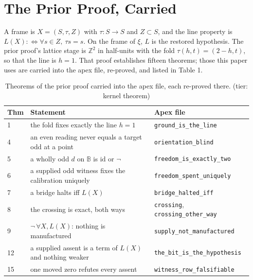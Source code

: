 \documentclass[10pt,twocolumn]{article}
\begin{document}
\hypertarget{the-prior-proof-carried}{%
\section{The Prior Proof, Carried}\label{the-prior-proof-carried}}

A frame is \(X = (S, \tau, Z)\) with \(\tau : S \to S\) and
\(Z \subset S\), and the line property is
\(L(X) :\Leftrightarrow \forall s \in Z,\ \tau s = s\). On the frame of
\(\xi\), \(L\) is the restored hypothesis. The prior proof's lattice
stage is \(\mathbb{Z}^2\) in half-units with the fold
\(\tau(h, t) = (2 - h, t)\), so that the line is \(h = 1\). That proof
establishes fifteen theorems; those this paper uses are carried into the
apex file, re-proved, and listed in Table 1.

\begin{table}[H]
\scriptsize
\caption{Theorems of the prior proof \cite{islamspine} carried into the apex file, each re-proved there. (tier: kernel theorem)}
\begin{tabular}{@{}p{}p{}p{}@{}}
\toprule
Thm & Statement & Apex file \\
\midrule
1 & the fold fixes exactly the line $h = 1$ & \texttt{ground\_\allowbreak is\_\allowbreak the\_\allowbreak line} \\
4 & an even reading never equals a target odd at a point & \texttt{orientation\_\allowbreak blind} \\
5 & a wholly odd $d$ on $\mathbb{B}$ is $\mathrm{id}$ or $\neg$ & \texttt{freedom\_\allowbreak is\_\allowbreak}\allowbreak\texttt{exactly\_\allowbreak two} \\
6 & a supplied odd witness fixes the calibration uniquely & \texttt{freedom\_\allowbreak spent\_\allowbreak}\allowbreak\texttt{uniquely} \\
7 & a bridge halts iff $L(X)$ & \texttt{bridge\_\allowbreak halted\_\allowbreak iff} \\
8 & the crossing is exact, both ways & \texttt{crossing}, \texttt{crossing\_\allowbreak other\_\allowbreak way} \\
9 & $\neg\,\forall X, L(X)$: nothing is manufactured & \texttt{supply\_\allowbreak not\_\allowbreak}\allowbreak\texttt{manufactured} \\
12 & a supplied assent is a term of $L(X)$ and nothing weaker & \texttt{the\_\allowbreak bit\_\allowbreak is\_\allowbreak}\allowbreak\texttt{the\_\allowbreak hypothesis} \\
15 & one moved zero refutes every assent & \texttt{witness\_\allowbreak row\_\allowbreak}\allowbreak\texttt{falsifiable} \\
\bottomrule
\end{tabular}
\end{table}
\end{document}
